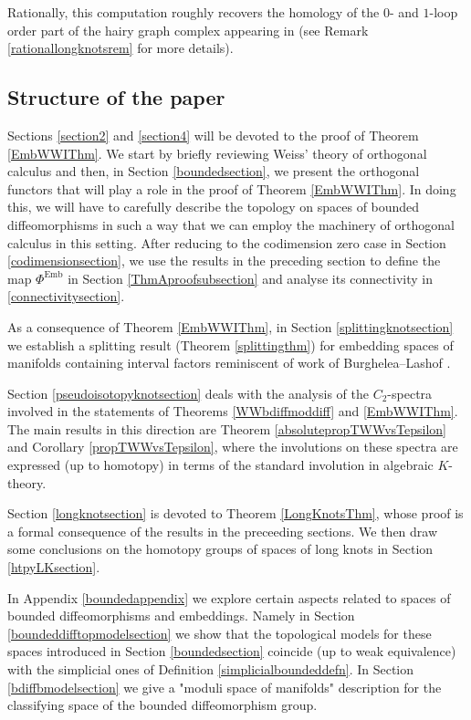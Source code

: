 \documentclass[a4paper, oneside]{amsart}
\newcommand{\emb}{\operatorname{Emb}}
\newcommand{\1}{\mathds{1}}
\theoremstyle{remark}
\theoremstyle{definition}
\numberwithin{equation}{section}
\begin{document}
Rationally, this computation roughly recovers the homology of the $0$- and $1$-loop order part of the hairy graph complex appearing in \cite[Eq. 2]{FresseTurchinWillwacher} (see Remark \ref{rationallongknotsrem} for more details).



\subsection*{Structure of the paper} Sections \ref{section2} and \ref{section4} will be devoted to the proof of Theorem \ref{EmbWWIThm}. We start by briefly reviewing Weiss' theory of orthogonal calculus and then, in Section \ref{boundedsection}, we present the orthogonal functors that will play a role in the proof of Theorem \ref{EmbWWIThm}. In doing this, we will have to carefully describe the topology on spaces of bounded diffeomorphisms in such a way that we can employ the machinery of orthogonal calculus in this setting. After reducing to the codimension zero case in Section \ref{codimensionsection}, we use the results in the preceding section to define the map $\Phi^{\emb}$ in Section \ref{ThmAproofsubsection} and analyse its connectivity in \ref{connectivitysection}.


As a consequence of Theorem \ref{EmbWWIThm}, in Section \ref{splittingknotsection} we establish a splitting result (Theorem \ref{splittingthm}) for embedding spaces of manifolds containing interval factors reminiscent of work of Burghelea--Lashof \cite[Cor. E]{BurgLash}.
 

Section \ref{pseudoisotopyknotsection} deals with the analysis of the $C_2$-spectra involved in the statements of Theorems \ref{WWbdiffmoddiff} and \ref{EmbWWIThm}. The main results in this direction are Theorem \ref{absolutepropTWWvsTepsilon} and Corollary \ref{propTWWvsTepsilon}, where the involutions on these spectra are expressed (up to homotopy) in terms of the standard involution in algebraic $K$-theory.

Section \ref{longknotsection} is devoted to Theorem \ref{LongKnotsThm}, whose proof is a formal consequence of the results in the preceeding sections. We then draw some conclusions on the homotopy groups of spaces of long knots in Section \ref{htpyLKsection}.

In Appendix \ref{boundedappendix} we explore certain aspects related to spaces of bounded diffeomorphisms and embeddings. Namely in Section \ref{boundeddifftopmodelsection} we show that the topological models for these spaces introduced in Section \ref{boundedsection} coincide (up to weak equivalence) with the simplicial ones of Definition \ref{simplicialboundeddefn}. In Section \ref{bdiffbmodelsection} we give a "moduli space of manifolds" description for the classifying space of the bounded diffeomorphism group.
\end{document}
